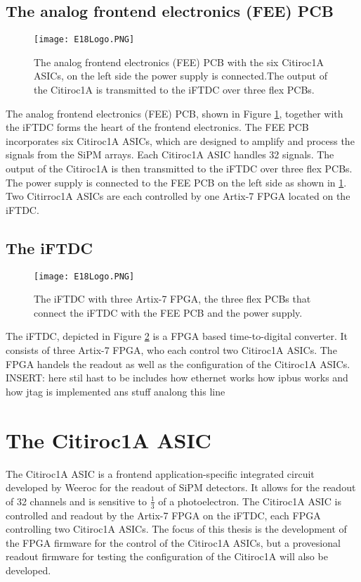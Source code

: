 \subsection{The analog frontend electronics (FEE) PCB}
\begin{figure}[H]
    \centering
    \texttt{[image: E18Logo.PNG]}
    \caption{The analog frontend electronics (FEE) PCB with the six Citiroc1A ASICs, on the left side the power supply is connected.The output of the Citiroc1A is transmitted to the iFTDC over three flex PCBs.\autocite{InternalcommunicationKarl}}
    \label{fig:FEE}
\end{figure}
The analog frontend electronics (FEE) PCB, shown in Figure \ref{fig:FEE}, together with the iFTDC forms the heart of the frontend electronics.
The FEE PCB incorporates six Citiroc1A ASICs, which are designed to amplify and process the signals from the SiPM arrays.
 Each Citiroc1A ASIC handles 32 signals. The output of the Citiroc1A is then transmitted to the iFTDC over three flex PCBs.
The power supply is connected to the FEE PCB on the left side as shown in \ref{fig:FEE}. Two Citirroc1A ASICs are each controlled by one Artix-7 FPGA located on the iFTDC.\autocite{InternalcommunicationIgor}
\subsection{The iFTDC}\label{sec:iFTDC}
\begin{figure}[H]
    \centering
    \texttt{[image: E18Logo.PNG]}
    \caption{The iFTDC with three Artix-7 FPGA, the three flex PCBs that connect the iFTDC with the FEE PCB and the power supply.\autocite{InternalcommunicationIgor}}
    \label{fig:iFTDC}
\end{figure}

The iFTDC, depicted in Figure \ref{fig:iFTDC} is a FPGA based time-to-digital converter. It consists of three Artix-7 FPGA, who each control two Citiroc1A ASICs.
The FPGA handels the readout as well as the configuration of the Citiroc1A ASICs\autocite{InternalcommunicationIgor}.
\newline
INSERT: here stil hast to be includes how ethernet works how ipbus works and how jtag is implemented ans stuff analong this line 
\section{The Citiroc1A ASIC}
The Citiroc1A ASIC is a frontend application-specific integrated circuit developed by Weeroc for the readout of SiPM detectors.
It allows for the readout of 32 channels and is sensitive to $\frac{1}{3}$ of a photoelectron.\autocite{datasheetCITIROC}
\newline
The Citiroc1A ASIC is controlled and readout by the Artix-7 FPGA on the iFTDC, each FPGA controlling two Citiroc1A ASICs.\autocite{InternalcommunicationIgor}
The focus of this thesis is the development of the FPGA firmware for the control of the Citiroc1A ASICs,
 but a provesional readout firmware for testing the configuration of the Citiroc1A will also be developed.
